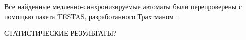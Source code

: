 \documentclass[11pt]{article}
\begin{document}

Все найденные медленно-синхронизируемые автоматы были перепроверены с помощью
пакета TESTAS, разработанного Трахтманом~\cite{Tr06}.



СТАТИСТИЧЕСКИЕ РЕЗУЛЬТАТЫ?

\end{document}
